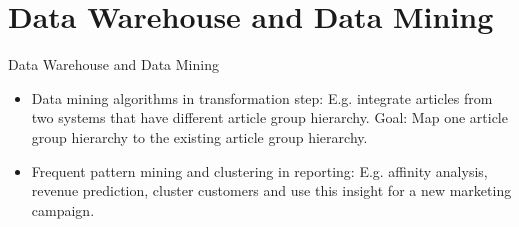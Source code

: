 \section{Data Warehouse and Data Mining}


\begin{frame}{Data Warehouse and Data Mining}
	\vspace*{-1em}
	

	\begin{itemize}
		\item Data mining algorithms in transformation step: E.g. integrate articles from two systems that have different article group hierarchy. Goal: Map one article group hierarchy to the existing article group hierarchy.
		\item Frequent pattern mining and clustering in reporting: E.g. affinity
		      analysis, revenue prediction, cluster customers and use this insight for a
		      new marketing campaign.
	\end{itemize}
\end{frame}
